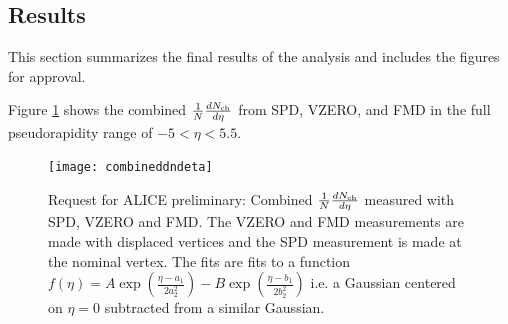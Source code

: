 \documentclass[11pt]{article}
\newcommand{\mult}[1][]{\ensuremath N_{\text{ch}#1}}
\newcommand{\dndeta}[1][]{{\ensuremath%
    \ifx|#1|\else\left.\fi%
    \frac{1}{N}\frac{d\mult{}}{d\eta}%
    \ifx|#1|\else\right|_{#1}\fi%
}}
\begin{document}
\subsection{Results}
This section summarizes the final results of the analysis and includes
the figures for approval.

Figure \ref{combineddndeta} shows the combined $\dndeta$ from SPD,
VZERO, and FMD in the full pseudorapidity range of $-5<\eta<5.5$.
\begin{figure}
  \centering
  \texttt{[image: combineddndeta]}
  \caption{Request for ALICE preliminary: Combined $\dndeta$ measured with SPD, VZERO and FMD. The
    VZERO and FMD measurements are made with displaced vertices and
    the SPD measurement is made at the nominal vertex. The fits are
    fits to a function $f(\eta) = A\exp (\frac{\eta -a_1}{2 a_2^2}) -
    B\exp (\frac{\eta -b_1}{2 b_{2}^2})$ i.e. a Gaussian centered on
    $ \eta = 0$ subtracted from a similar Gaussian.}
  \label{combineddndeta}
\end{figure} 
\end{document}
